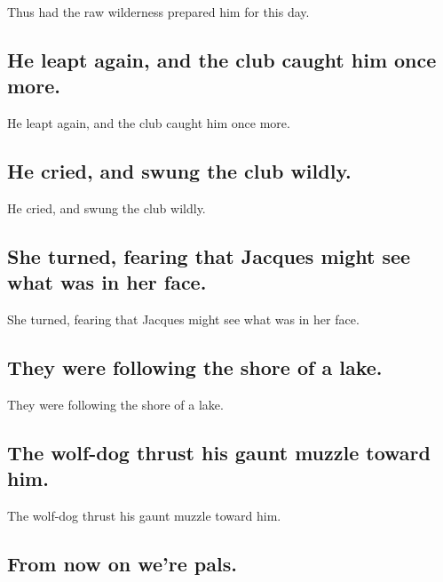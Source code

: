 \documentclass[]{article}
\begin{document}
Thus had the raw wilderness prepared him for this day.

\hypertarget{he-leapt-again-and-the-club-caught-him-once-more.}{%
\subsection{He leapt again, and the club caught him once
more.}\label{he-leapt-again-and-the-club-caught-him-once-more.}}

He leapt again, and the club caught him once more.

\hypertarget{he-cried-and-swung-the-club-wildly.}{%
\subsection{He cried, and swung the club
wildly.}\label{he-cried-and-swung-the-club-wildly.}}

He cried, and swung the club wildly.

\hypertarget{she-turned-fearing-that-jacques-might-see-what-was-in-her-face.}{%
\subsection{She turned, fearing that Jacques might see what was in her
face.}\label{she-turned-fearing-that-jacques-might-see-what-was-in-her-face.}}

She turned, fearing that Jacques might see what was in her face.

\hypertarget{they-were-following-the-shore-of-a-lake.}{%
\subsection{They were following the shore of a
lake.}\label{they-were-following-the-shore-of-a-lake.}}

They were following the shore of a lake.

\hypertarget{the-wolf-dog-thrust-his-gaunt-muzzle-toward-him.}{%
\subsection{The wolf-dog thrust his gaunt muzzle toward
him.}\label{the-wolf-dog-thrust-his-gaunt-muzzle-toward-him.}}

The wolf-dog thrust his gaunt muzzle toward him.

\hypertarget{from-now-on-were-pals.}{%
\subsection{From now on we're pals.}\label{from-now-on-were-pals.}}
\end{document}
